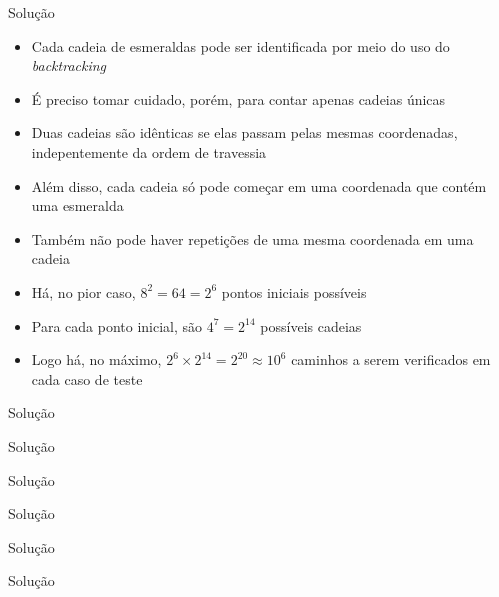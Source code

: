 \begin{frame}[fragile]{Solução}

    \begin{itemize}
        \item Cada cadeia de esmeraldas pode ser identificada por meio do uso do
            \textit{backtracking} 

        \item É preciso tomar cuidado, porém, para contar apenas cadeias únicas

        \item Duas cadeias são idênticas se elas passam pelas mesmas coordenadas, indepentemente
            da ordem de travessia

        \item Além disso, cada cadeia só pode começar em uma coordenada que contém uma
            esmeralda
            
        \item Também não pode haver repetições de uma mesma coordenada em uma cadeia

        \item Há, no pior caso, $8^2 = 64 = 2^6$ pontos iniciais possíveis

        \item Para cada ponto inicial, são $4^7 = 2^{14}$ possíveis cadeias

        \item Logo há, no máximo, $2^6 \times 2^{14} = 2^{20} \approx 10^6$ caminhos a serem
            verificados em cada caso de teste
   \end{itemize}

\end{frame}

\begin{frame}[fragile]{Solução}
\end{frame}

\begin{frame}[fragile]{Solução}
\end{frame}

\begin{frame}[fragile]{Solução}
\end{frame}

\begin{frame}[fragile]{Solução}
\end{frame}

\begin{frame}[fragile]{Solução}
\end{frame}

\begin{frame}[fragile]{Solução}
\end{frame}
